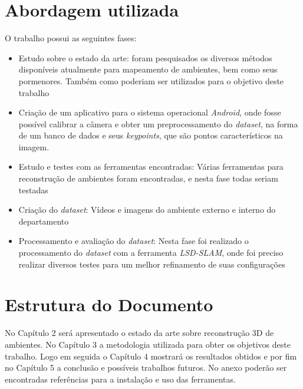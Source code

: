 \section{Abordagem utilizada}

O trabalho possui as seguintes fases:
\begin{itemize}
\item{Estudo sobre o estado da arte: foram pesquisados os diversos métodos disponíveis atualmente para mapeamento de ambientes, bem como seus pormenores. Também como  poderiam ser utilizados para o objetivo deste trabalho}
\item{Criação de um aplicativo para o sistema operacional \textit{Android}, onde fosse possível calibrar a câmera e obter um preprocessamento do \textit{dataset}, na forma de um banco de dados e seus \textit{keypoints}, que são pontos característicos na imagem.}
\item{Estudo e testes com as ferramentas encontradas: Várias ferramentas para reconstrução de ambientes foram encontradas, e nesta fase todas seriam testadas}
\item{Criação do \textit{dataset}: Vídeos e imagens do ambiente externo e interno do departamento}
\item{Processamento e avaliação do \textit{dataset}: Nesta fase foi realizado o processamento do \textit{dataset} com a ferramenta \textit{LSD-SLAM}, onde foi preciso realizar diversos testes para um melhor refinamento de suas configurações}
\end{itemize}


\section{Estrutura do Documento}

No Capítulo 2 será apresentado o estado da arte sobre reconstrução 3D de ambientes. No Capítulo 3 a metodologia utilizada para obter os objetivos deste trabalho. Logo em seguida o Capítulo 4 mostrará os resultados obtidos e por fim no Capítulo 5 a conclusão e possíveis trabalhos futuros. No anexo poderão ser encontradas referências para a instalação e uso das ferramentas.
